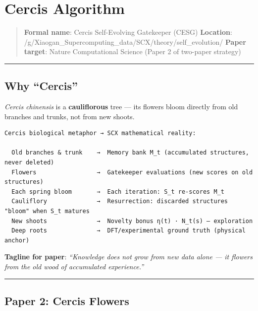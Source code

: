 \documentclass[
  12pt,
]{article}
\author{SCX}
\date{2026}
\begin{document}
\section{Cercis Algorithm}\label{cercis-algorithm}

\begin{quote}
\textbf{Formal name}: Cercis Self-Evolving Gatekeeper (CESG)
\textbf{Location}:
/g/Xiaogan\_Supercomputing\_data/SCX/theory/self\_evolution/
\textbf{Paper target}: Nature Computational Science (Paper 2 of
two-paper strategy)
\end{quote}

\begin{center}\rule{0.5\linewidth}{0.5pt}\end{center}

\subsection{Why ``Cercis''}\label{why-cercis}

\emph{Cercis chinensis} is a \textbf{cauliflorous} tree --- its
flowers bloom directly from old branches and trunks, not from new
shoots.

\begin{verbatim}
Cercis biological metaphor → SCX mathematical reality:

  Old branches & trunk    →  Memory bank M_t (accumulated structures, never deleted)
  Flowers                 →  Gatekeeper evaluations (new scores on old structures)
  Each spring bloom       →  Each iteration: S_t re-scores M_t
  Cauliflory              →  Resurrection: discarded structures "bloom" when S_t matures
  New shoots              →  Novelty bonus η(t) · N_t(s) — exploration
  Deep roots              →  DFT/experimental ground truth (physical anchor)
\end{verbatim}

\textbf{Tagline for paper}: \emph{``Knowledge does not grow from new
data alone --- it flowers from the old wood of accumulated
experience.''}

\begin{center}\rule{0.5\linewidth}{0.5pt}\end{center}

\subsection{Paper 2: Cercis Flowers}\label{paper-2-cercis-flowers}
\end{document}
